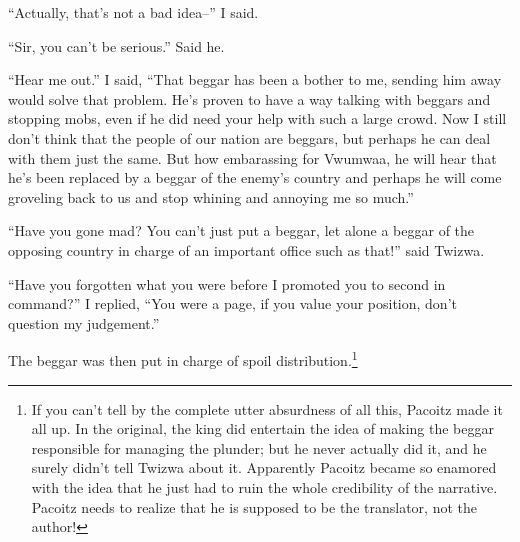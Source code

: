 ``Actually, that's not a bad idea--'' I said.

``Sir, you can't be serious.'' Said he.

``Hear me out.'' I said, ``That beggar has been a bother to me, sending him away would solve that problem. He's proven to have a way talking with beggars and stopping mobs, even if he did need your help with such a large crowd. Now I still don't think that the people of our nation are beggars, but perhaps he can deal with them just the same. But how embarassing for Vwumwaa, he will hear that he's been replaced by a beggar of the enemy's country and perhaps he will come groveling back to us and stop whining and annoying me so much.''

``Have you gone mad? You can't just put a beggar, let alone a beggar of the opposing country in charge of an important office such as that!'' said Twizwa.

``Have you forgotten what you were before I promoted you to second in command?'' I replied, ``You were a page, if you value your position, don't question my judgement.''

The beggar was then put in charge of spoil distribution.\footnote{If you can't tell by the complete utter absurdness of all this, Pacoitz made it all up. In the original, the king did entertain the idea of making the beggar responsible for managing the plunder; but he never actually did it, and he surely didn't tell Twizwa about it. Apparently Pacoitz became so enamored with the idea that he just had to ruin the whole credibility of the narrative.
Pacoitz needs to realize that he is supposed to be the translator, not the author!}


